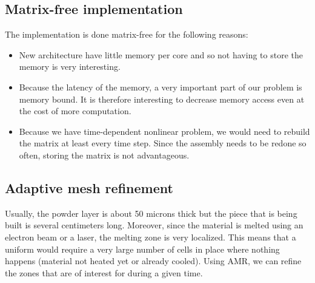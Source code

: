 \documentclass[letterpaper]{article}
\renewcommand{\(}{\left(}
\renewcommand{\)}{\right)}
\renewcommand{\[}{\left[}
\renewcommand{\]}{\right]}
\begin{document}
\subsection{Matrix-free implementation}
The implementation is done matrix-free for the following reasons:
\begin{itemize}
  \item New architecture have little memory per core and so not having to store
    the memory is very interesting.
  \item Because the latency of the memory, a very important part of our problem
    is memory bound. It is therefore interesting to decrease memory access even
    at the cost of more computation.
  \item Because we have time-dependent nonlinear problem, we would need to
    rebuild the matrix at least every time step. Since the assembly needs to be
    redone so often, storing the matrix is not advantageous.
\end{itemize}

\subsection{Adaptive mesh refinement}
Usually, the powder layer is about 50 microns thick but the piece that is being
built is several centimeters long. Moreover, since the material is melted using
an electron beam or a laser, the melting zone is very localized. This means that
a uniform would require a very large number of cells in place where nothing
happens (material not heated yet or already cooled). Using AMR, we can refine
the zones that are of interest for during a given time.
\end{document}

